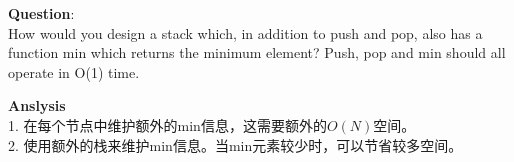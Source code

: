     
\begin{description}
    \item{\textbf{Question}}:\\%
		How would you design a stack which, in addition to push and pop, also has a function min which returns the minimum element? Push, pop and min should all operate in O(1) time.

    \item{\textbf{Anslysis}}\\
		1. 在每个节点中维护额外的min信息，这需要额外的$O(N)$空间。\\
		2. 使用额外的栈来维护min信息。当min元素较少时，可以节省较多空间。

\end{description}


